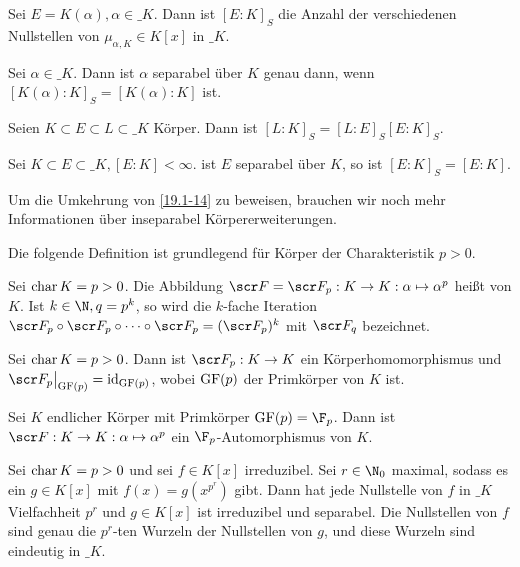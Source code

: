 \begin{lem} \label{19.1-11}
	Sei $E = K(\alpha), \alpha \in \_K$.
	Dann ist $[E : K]_S$ die Anzahl der verschiedenen Nullstellen von $\mu_{\alpha, K} \in K[x]$ in $\_K$.
\end{lem}

\begin{kor} \label{19.1-12}
	Sei $\alpha \in \_K$.
	Dann ist $\alpha$ separabel über $K$ genau dann, wenn $[K(\alpha) : K]_S = [K(\alpha) : K]$ ist.
\end{kor}

\begin{st} \label{19.1-13}
	Seien $K \subset E \subset L \subset \_K$ Körper.
	Dann ist $[L : K]_S = [L : E]_S [E : K]_S$.
\end{st}

\begin{lem} \label{19.1-14}
	Sei $K \subset E \subset \_K, [E : K] < \infty$.
	ist $E$ separabel über $K$, so ist $[E : K]_S = [E : K]$.
\end{lem}

Um die Umkehrung von \ref{19.1-14} zu beweisen, brauchen wir noch mehr Informationen über inseparabel Körpererweiterungen.

Die folgende Definition ist grundlegend für Körper der Charakteristik $p > 0$.

\begin{df} \label{19.1-15}
	Sei $\operatorname{char} K = p > 0$.
	Die Abbildung $\scr F = \scr F_p: K \to K: \alpha \mapsto \alpha^p$ heißt  von $K$.
	Ist $k \in \N, q = p^k$, so wird die $k$-fache Iteration $\scr F_p \circ \scr F_p \circ \dotsb \circ \scr F_p = (\scr F_p)^k$ mit $\scr F_q$ bezeichnet.
\end{df}

\begin{st} \label{19.1-16}
	Sei $\operatorname{char} K = p > 0$.
	Dann ist $\scr F_p: K \to K$ ein Körperhomomorphismus und $\scr F_p\big|_{\GF(p)} = \id_{\GF(p)}$, wobei $\operatorname{GF}(p)$ der Primkörper von $K$ ist.
\end{st}

\begin{kor} \label{19.1-17}
	Sei $K$ endlicher Körper mit Primkörper $\GF(p) = \F_p$.
	Dann ist $\scr F: K \to K: \alpha \mapsto \alpha^p$ ein $\F_p$-Automorphismus von $K$.
\end{kor}

\begin{lem} \label{19.1-18}
	Sei $\operatorname{char} K = p > 0$ und sei $f \in K[x]$ irreduzibel.
	Sei $r \in \N_0$ maximal, sodass es ein $g \in K[x]$ mit $f(x) = g(x^{p^r})$ gibt.
	Dann hat jede Nullstelle von $f$ in $\_K$ Vielfachheit $p^r$ und $g \in K[x]$ ist irreduzibel und separabel.
	Die Nullstellen von $f$ sind genau die $p^r$-ten Wurzeln der Nullstellen von $g$, und diese Wurzeln sind eindeutig in $\_K$.
\end{lem}

